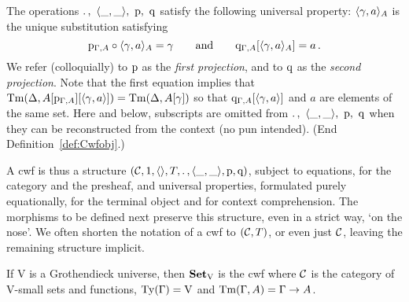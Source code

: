 \documentclass{mscs}
\def\V{\mathrm{V}}
\begin{document}
\begin{definition}
The operations  ${.\,},~\langle \_,\_ \rangle,~\mathrm{p},~\mathrm{q}$
satisfy the following universal property:
$\langle \gamma, a \rangle_A$ is the unique substitution satisfying
\[
\mathrm{p}_{\Gamma, A} \circ \langle \gamma, a \rangle_A = \gamma
\qquad \text{and}\qquad
\mathrm{q}_{\Gamma, A} [\langle \gamma, a \rangle_A] = a\,.
\]
We refer (colloquially) to $\mathrm{p}$ as the \emph{first projection},
and to $\mathrm{q}$ as the \emph{second projection}. %
{Note that the first equation implies that
$\mathrm{Tm}(\Delta,A[\mathrm{p}_{\Gamma,A}][\langle \gamma, a \rangle]) = \mathrm{Tm}(\Delta,A[\gamma])$
so that $\mathrm{q}_{\Gamma, A} [\langle \gamma, a \rangle]$ and $a$ are elements of the same set.}
Here and below, subscripts are omitted from ${.\,},~\langle \_,\_ \rangle,~\mathrm{p},~\mathrm{q}$
when they can be reconstructed from the context (no pun intended).
(End Definition~\ref{def:Cwfobj}.)
\end{definition}

A cwf is thus a structure $({\mathcal C},1,\langle  \rangle,T,.\, , \langle \_,\_ \rangle,\mathrm{p}, \mathrm{q})$,
subject to equations, for the category and the presheaf, and universal
properties, formulated purely equationally, for the terminal object and for context comprehension.
The morphisms to be defined next preserve this structure,
even in a strict way, `on the nose'.
We often shorten the notation of a cwf to $({\mathcal C},T)$, or even just ${\mathcal C}$,
leaving the remaining structure implicit.

If $\V$ is a Grothendieck universe, then $\Set_\V$ is the cwf where ${\mathcal C}$ is the category of $\V$-small sets and functions, $\Ty(\Gamma) = \V$ and $\mathrm{Tm}(\Gamma,A) = \Gamma \to A$.
\end{document}
